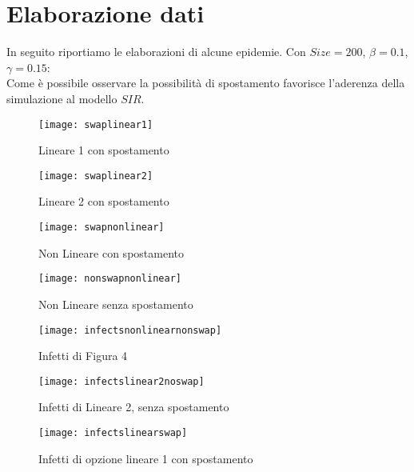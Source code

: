 \documentclass[a4paper]{article}
\begin{document}
\section{Elaborazione dati}
 In seguito riportiamo le elaborazioni di alcune epidemie. Con $Size = 200$, $\beta = 0.1$, $\gamma = 0.15$:\\
 Come è possibile osservare la possibilità di spostamento favorisce l'aderenza della simulazione al modello $SIR$.\\
\begin{figure}[!h]
	\centering
	\texttt{[image: swaplinear1]}
	\caption[Lineare 1 con spostamento]{Lineare 1 con spostamento}
	\label{fig:swaplinear1}
\end{figure}
\begin{figure}[!h]
	\centering
	\texttt{[image: swaplinear2]}
	\caption[Lineare 2 con spostamento]{Lineare 2 con spostamento}
	\label{fig:swaplinear1}
\end{figure}
\begin{figure}[!h]
	\centering
	\texttt{[image: swapnonlinear]}
	\caption[nonLineare  con spostamento]{Non Lineare con spostamento}
	\label{fig:swaplinear1}
\end{figure}
\begin{figure}[!h]
	\centering
	\texttt{[image: nonswapnonlinear]}
	\caption[nonLineare noSpostamento]{Non Lineare senza spostamento}
	\label{fig:swaplinear1}
\end{figure}
\begin{figure}[!h]
	\centering
	\texttt{[image: infectsnonlinearnonswap]}
	\caption[Infetti nonLineare noSpostamento]{Infetti di Figura 4}
	\label{fig:swaplinear1}
\end{figure}

\begin{figure}[!h]
	\centering
	\texttt{[image: infectslinear2noswap]}
	\caption[Infetti lineare 2 noSpostamento]{Infetti di Lineare 2, senza spostamento}
	
\end{figure}
\begin{figure}[!h]
	\centering
	\texttt{[image: infectslinearswap]}
	\caption[Infetti lineare 2 noSpostamento]{Infetti di opzione lineare 1 con spostamento}
	
\end{figure}
\end{document}
